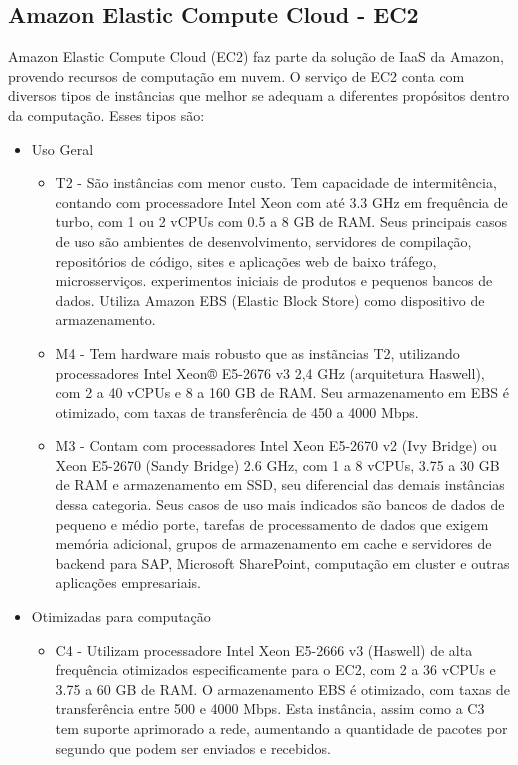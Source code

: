 \documentclass[tg]{mdtufsm}
\begin{document}
\subsection{Amazon Elastic Compute Cloud - EC2}

Amazon Elastic Compute Cloud (EC2) faz parte da solução de IaaS da Amazon, provendo recursos de computação em nuvem. O serviço de EC2 conta com diversos tipos de instâncias que melhor se adequam a diferentes propósitos dentro da computação. Esses tipos são:

\begin{itemize}
\item Uso Geral
	\begin{itemize}
	\item T2 - São instâncias com menor custo. Tem capacidade de intermitência, contando com processadore Intel Xeon com até 3.3 GHz em frequência de turbo, com 1 ou 2 vCPUs com 0.5 a 8 GB de RAM. Seus principais casos de uso são ambientes de desenvolvimento, servidores de compilação, repositórios de código, sites e aplicações web de baixo tráfego, microsserviços. experimentos iniciais de produtos e pequenos bancos de dados. Utiliza Amazon EBS (Elastic Block Store) como dispositivo de armazenamento.
	\item M4 - Tem hardware mais robusto que as instãncias T2, utilizando processadores Intel Xeon® E5-2676 v3 2,4 GHz (arquitetura Haswell), com 2 a 40 vCPUs e 8 a 160 GB de RAM. Seu armazenamento em EBS é otimizado, com taxas de transferência de 450 a 4000 Mbps.
	\item M3 - Contam com processadores Intel Xeon E5-2670 v2 (Ivy Bridge) ou Xeon E5-2670 (Sandy Bridge) 2.6 GHz, com 1 a 8 vCPUs, 3.75 a 30 GB de RAM e armazenamento em SSD, seu diferencial das demais instâncias dessa categoria. Seus casos de uso mais indicados são bancos de dados de pequeno e médio porte, tarefas de processamento de dados que exigem memória adicional, grupos de armazenamento em cache e servidores de backend para SAP, Microsoft SharePoint, computação em cluster e outras aplicações empresariais.
	\end{itemize}
\item Otimizadas para computação
	\begin{itemize}
	\item C4 - Utilizam processadore Intel Xeon E5-2666 v3 (Haswell) de alta frequência otimizados especificamente para o EC2, com 2 a 36 vCPUs e 3.75 a 60 GB de RAM. O armazenamento EBS é otimizado, com taxas de transferência entre 500 e 4000 Mbps. Esta instância, assim como a C3 tem suporte aprimorado a rede, aumentando a quantidade de pacotes por segundo que podem ser enviados e recebidos.

\end{itemize}
\end{itemize}
\end{document}
